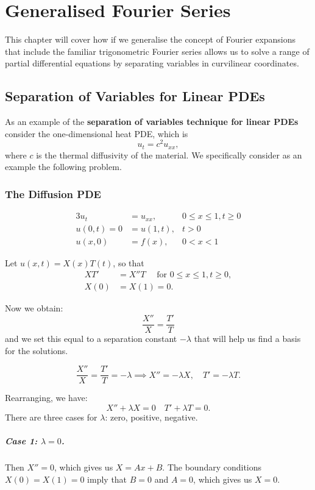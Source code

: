 \chapter{Generalised Fourier Series}
This chapter will cover how if we generalise the concept of Fourier expansions that include the familiar trigonometric Fourier series allows us to solve a range of partial differential equations by separating variables in curvilinear coordinates.

\section{Separation of Variables for Linear PDEs}
As an example of the \textbf{separation of variables technique for linear PDEs}
consider the one-dimensional heat PDE, which is
\[u_t = c^2u_{xx},\]
where \(c\) is the thermal diffusivity of the material. We specifically consider as an example the following problem.

\subsection{The Diffusion PDE}
\begin{alignat*}{3}
    u_t         & = u_{xx},  & 0 \leq x \leq 1, t \geq 0 \\
    u(0, t) = 0 & = u(1, t), & t > 0                     \\
    u(x, 0)     & = f(x),    & 0 < x < 1
\end{alignat*}

Let \(u(x, t) = X(x)T(t)\), so that
\begin{align*}
    XT'  & = X''T \quad \text{ for } 0 \leq x \leq 1, t \geq 0, \\
    X(0) & = X(1) = 0.
\end{align*}

Now we obtain:
\[\frac{X''}{X} = \frac{T'}{T}\]
and we set this equal to a separation constant \(-\lambda\) that will help us find a basis for the solutions.

\[\frac{X''}{X} = \frac{T'}{T} = -\lambda \implies X'' = -\lambda X, \quad T' = -\lambda T.\]

Rearranging, we have:
\[X'' + \lambda X = 0 \quad T' + \lambda T = 0.\]
There are three cases for \(\lambda\): zero, positive, negative.

\paragraph{Case 1: \(\lambda = 0\).}
Then \(X'' = 0\), which gives us \(X = Ax + B\). The boundary conditions \(X(0) = X(1) = 0\) imply that \(B = 0\) and \(A = 0\), which gives us \(X = 0\).

